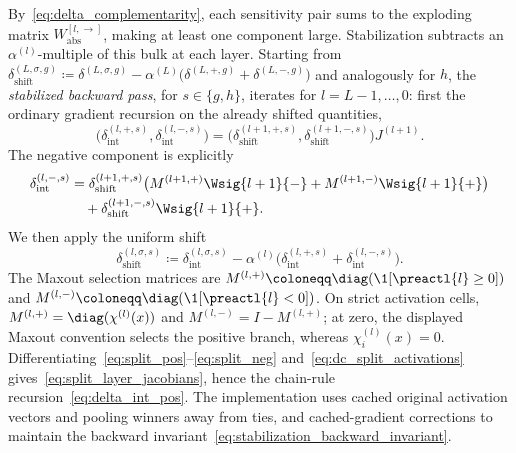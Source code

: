 By~\eqref{eq:delta_complementarity}, each sensitivity pair sums to the exploding matrix $W_{\mathrm{abs}}^{[l, \rightarrow]}$, making at least one component large. Stabilization subtracts an $\alpha^{(l)}$-multiple of this bulk at each layer. Starting from $\delta_{\mathrm{shift}}^{(L,\sigma,g)} \coloneqq \delta^{(L,\sigma,g)} - \alpha^{(L)} \bigl( \delta^{(L,+,g)} + \delta^{(L,-,g)} \bigr)$ and analogously for $h$, the \emph{stabilized backward pass}, for $s\in\{g,h\}$, iterates for $l = L-1, \dots, 0$: first the ordinary gradient recursion on the already shifted quantities,
\begin{equation}
\bigl(\delta_{\mathrm{int}}^{(l,+,s)},\delta_{\mathrm{int}}^{(l,-,s)}\bigr)
=\bigl(\delta_{\mathrm{shift}}^{(l+1,+,s)},\delta_{\mathrm{shift}}^{(l+1,-,s)}\bigr)J^{(l+1)}.
\label{eq:delta_int_pos}
\end{equation}
The negative component is explicitly
\begin{align}
\delta_{\mathrm{int}}^{(l,-,s)}
&=\delta_{\mathrm{shift}}^{(l+1,+,s)}\bigl(M^{(l+1,+)}\Wsig{l+1}{-}+M^{(l+1,-)}\Wsig{l+1}{+}\bigr)\nonumber\\
&\quad+\delta_{\mathrm{shift}}^{(l+1,-,s)}\Wsig{l+1}{+}.
\label{eq:delta_minus_recursion}
\end{align}
We then apply the uniform shift
\begin{equation}
	\delta_{\mathrm{shift}}^{(l,\sigma,s)} \coloneqq \delta_{\mathrm{int}}^{(l,\sigma,s)} - \alpha^{(l)} \bigl( \delta_{\mathrm{int}}^{(l,+,s)} + \delta_{\mathrm{int}}^{(l,-,s)} \bigr).
	\label{eq:delta_shift_def}
\end{equation}
The Maxout selection matrices are $M^{(l,+)}\coloneqq\diag(\1[\preactl{l}\ge0])$ and $M^{(l,-)}\coloneqq\diag(\1[\preactl{l}<0])$. On strict activation cells, $M^{(l,+)}=\diag(\chi^{(l)}(x))$ and $M^{(l,-)}=I-M^{(l,+)}$; at zero, the displayed Maxout convention selects the positive branch, whereas $\chi^{(l)}_i(x)=0$. Differentiating~\eqref{eq:split_pos}--\eqref{eq:split_neg} and~\eqref{eq:dc_split_activations} gives~\eqref{eq:split_layer_jacobians}, hence the chain-rule recursion~\eqref{eq:delta_int_pos}. The implementation uses cached original activation vectors and pooling winners away from ties, and cached-gradient corrections to maintain the backward invariant~\eqref{eq:stabilization_backward_invariant}.

